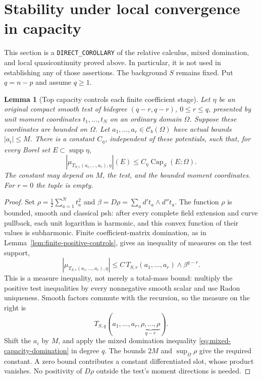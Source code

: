 \documentclass[11pt,a4paper]{article}
\numberwithin{equation}{section}
\newtheorem{lemma}[theorem]{Lemma}
\theoremstyle{definition}
\theoremstyle{remark}
\newcommand{\Cb}{\mathcal C_b}
\begin{document}


\section{Stability under local convergence in capacity}
\label{sec:capacity-stability}

This section is a \texttt{DIRECT\_COROLLARY} of the relative calculus,
mixed domination, and local quasicontinuity proved above. In particular,
it is not used in establishing any of those assertions. The background
$S$ remains fixed. Put $q=n-p$ and assume $q\geq1$.

\begin{lemma}[Top capacity controls each finite coefficient stage]
\label{lem:top-capacity-coefficients}
Let $\eta$ be an original compact smooth test of bidegree
$(q-r,q-r)$, $0\leq r\leq q$, presented by unit moment coordinates
$t_1,\ldots,t_N$ on an ordinary domain $\Omega$. Suppose these
coordinates are bounded on $\Omega$. Let
$a_1,\ldots,a_r\in\Cb(\Omega)$ have actual bounds $|a_i|\leq M$.
There is a constant $C_\eta$, independent of these potentials, such
that, for every Borel set $E\subset\operatorname{supp}\eta$,
\[
 |\mu_{T_{S,r}(a_1,\ldots,a_r),\eta}|(E)
       \leq C_\eta\operatorname{Cap}_S(E;\Omega).
\]
The constant may depend on $M$, the test, and the bounded moment
coordinates. For $r=0$ the tuple is empty.
\end{lemma}

\begin{proof}
Set $\rho=\frac12\sum_{a=1}^Nt_a^2$ and
$\beta=D\rho=\sum_a d't_a\wedge d''t_a$. The function $\rho$ is
bounded, smooth and classical psh: after every complete field extension
and curve pullback, each unit logarithm is harmonic, and this convex
function of their values is subharmonic. Finite coefficient-matrix
domination, as in Lemma~\ref{lem:finite-positive-controls}, gives an
inequality of measures on the test support,
\[
 |\mu_{T_{S,r}(a_1,\ldots,a_r),\eta}|
 \leq C\,T_{S,r}(a_1,\ldots,a_r)\wedge\beta^{q-r}.
\]
This is a measure inequality, not merely a total-mass bound: multiply
the positive test inequalities by every nonnegative smooth scalar and
use Radon uniqueness. Smooth factors commute with the recursion, so
the measure on the right is
\[
 T_{S,q}(a_1,\ldots,a_r,
             \underbrace{\rho,\ldots,\rho}_{q-r}).
\]
Shift the $a_i$ by $M$, and apply the mixed domination inequality
\eqref{eq:mixed-capacity-domination} in degree $q$. The bounds $2M$
and $\sup_\Omega\rho$ give the required constant. A zero bound
contributes a constant differentiated slot, whose product vanishes.
No positivity of $D\rho$ outside the test's moment directions is
needed.
\end{proof}
\end{document}
